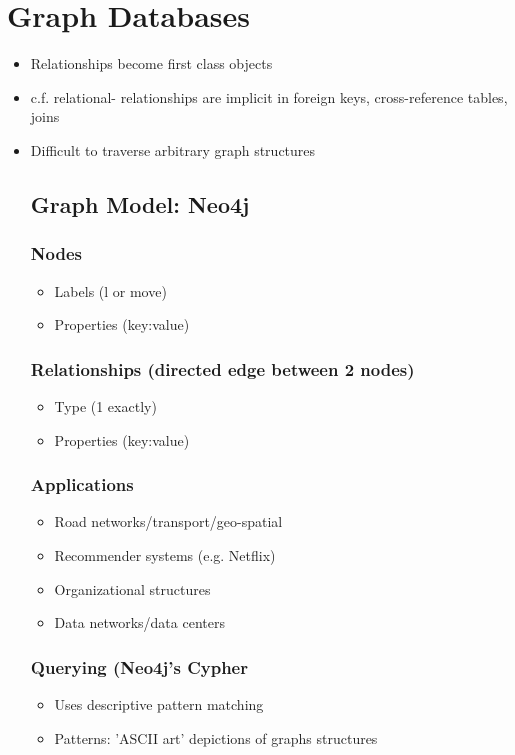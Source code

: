 \documentclass[12pt]{article}
\begin{document}
	\section*{Graph Databases}
		\begin{itemize}
			\item
				Relationships become first class objects
			\item
				c.f. relational- relationships are implicit in foreign keys, cross-reference tables, joins
			\item
				Difficult to traverse arbitrary graph structures
			\subsection*{Graph Model: Neo4j}
				\subsubsection*{Nodes}
					\begin{itemize}
						\item
							Labels (l or move)
						\item
							Properties (key:value)
					\end{itemize}
				\subsubsection*{Relationships (directed edge between 2 nodes)}
					\begin{itemize}
						\item
							Type (1 exactly)
						\item
							Properties (key:value)
					\end{itemize}
				\subsubsection*{Applications}
					\begin{itemize}
						\item
							Road networks/transport/geo-spatial
						\item
							Recommender systems (e.g. Netflix)
						\item
							Organizational structures
						\item
							Data networks/data centers
					\end{itemize}
					\subsubsection*{Querying (Neo4j's Cypher}
					\begin{itemize}
						\item
							Uses descriptive pattern matching
						\item
							Patterns: 'ASCII art' depictions of graphs structures
					\end{itemize}
		\end{itemize}
\end{document}
